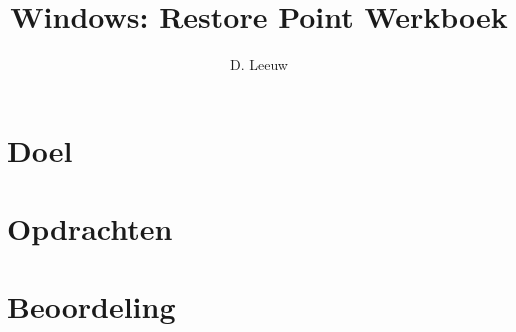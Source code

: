 \documentclass[a4paper,12pt,twoside,titlepage]{article}
\author{D. Leeuw}
\title{Windows: Restore Point Werkboek}
\date{\today\\
0.0.0
\vfill
\raggedright
\copyright\ 2026 Dennis Leeuw\\
}
\begin{document}

\maketitle



\section{Doel}


\section{Opdrachten}


\section{Beoordeling}


\printindex
\end{document}
